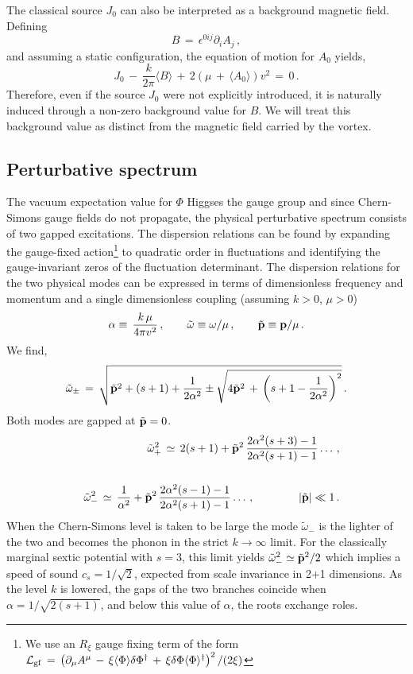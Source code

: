 \documentclass[12pt,a4paper]{article}
\def\be{\begin{equation}}
\def\ee{\end{equation}}
\newcommand{\bea}{\begin{eqnarray}}
\newcommand{\eea}{\end{eqnarray}}
\begin{document}
The classical source $J_0$ can also be interpreted as a background magnetic field. Defining
\be
B\,=\,\epsilon^{0ij}\partial_i A_j\,,
\ee 
and assuming a static configuration, the equation of motion for $A_0$ yields,
\be
J_0\,-\,\frac{k}{2\pi}\langle B\rangle\,+\,2\left(\mu\,+\,\langle A_0\rangle\right) v^2\,=\,0\,.
\ee
Therefore, even if the source $J_0$ were not  explicitly introduced, it is naturally induced through a non-zero background value for  $B$. We will treat this background value as distinct from the magnetic field carried by the vortex.

\subsection{Perturbative spectrum} The vacuum expectation value for $\Phi$ Higgses the gauge group and since Chern-Simons gauge fields do not propagate, the physical perturbative spectrum consists of two gapped excitations.  The dispersion relations can be found by expanding the gauge-fixed  action\footnote{We use an $R_\xi$ gauge fixing term of the form ${\cal L}_{\rm gf}\,=\,\left(\partial_\mu A^{\mu}\,-\,\xi \langle\Phi\rangle\delta\Phi^\dagger\,+\,\xi\delta\Phi\langle\Phi\rangle^\dagger\right)^2/(2\xi)$} to  quadratic order in fluctuations and identifying the gauge-invariant zeros of the fluctuation determinant. The dispersion relations for the two physical modes can be expressed in terms of dimensionless frequency and  momentum  and a single dimensionless coupling (assuming $k>0$, $\mu>0$)
\be
\alpha\equiv\, \frac{k\,\mu}{4\pi v^2}\,,\qquad \tilde \omega\equiv\omega/\mu\,,\qquad \tilde{\bf p}\equiv {\bf p}/\mu\,.\label{alpha}
\ee
We find,
\be
\tilde\omega_{\pm}\,=\,\sqrt{\tilde{\bf p}^2+(s+1)+\frac{1}{2\alpha^2}\pm\sqrt{4\tilde{\bf p}^2\,+\,\left(s+1-\frac{1}{2\alpha^2}\right)^2}}\,.
\ee
Both modes are gapped at $\tilde{\bf p}=0$. 
\bea
&&\tilde\omega^2_+\,\simeq\,2(s+1)+\tilde{\bf p}^2\,\frac{2\alpha^2(s+3)-1}{2\alpha^2(s+1)-1}\ldots\,, \\\nonumber \\\nonumber
&&\tilde\omega^2_-\,\simeq\,\frac{1}{\alpha^2}+\tilde{\bf p}^2\,\frac{2\alpha^2(s-1)-1}{2\alpha^2(s+1)-1}\ldots\,,\qquad\qquad |\tilde {\bf p}|\ll1\,.
\eea
When the Chern-Simons level is taken to be large the mode $\tilde\omega_{-}$ is the lighter of the two and becomes the phonon in the strict $k\to\infty$ limit.
For the classically marginal sextic potential with $s=3$, this limit yields $\tilde\omega_-^2\simeq \tilde {\bf p}^2/2$ which implies a speed of sound $c_s=1/\sqrt 2$, expected from scale invariance in 2+1 dimensions. As the level $k$ is lowered, the gaps of the two branches coincide when $\alpha=1/\sqrt{2(s+1)}$, and below this value of $\alpha$, the roots exchange roles.
\end{document}
